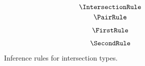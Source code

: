 
\begin{figure}
    \centering
    $$\IntersectionRule$$
    $$\PairRule$$
    \begin{minipage}{0.5\textwidth}
        $$\FirstRule$$
    \end{minipage}%
    \begin{minipage}{0.5\textwidth}
        $$\SecondRule$$
    \end{minipage}
    \caption{
        Inference rules for intersection types.
    }
\end{figure}
